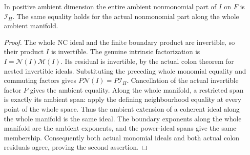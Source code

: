 \begin{theorem}
\label{hir:general-nc-actual-joint-residual}
\leanok
In positive ambient dimension the entire ambient nonmonomial part of
$I$ on $F$ is $\mathcal I_H$. The same equality holds for the actual
nonmonomial part along the whole ambient manifold.
\end{theorem}
\begin{proof}
The whole NC ideal and the finite boundary product are invertible, so
their product $I$ is invertible. The genuine intrinsic factorization is
$I=\mathcal N(I)\mathcal M(I)$. Its residual is invertible, by the actual
colon theorem for nested invertible ideals. Substituting the preceding
whole monomial equality and commuting factors gives
$P\mathcal N(I)=P\mathcal I_H$. Cancellation of the actual invertible
factor $P$ gives the ambient equality. Along the whole manifold, a
restricted span is exactly its ambient span: apply the defining
neighbourhood equality at every point of the whole space. Thus the
ambient extension of a coherent ideal along the whole manifold is the
same ideal. The boundary exponents along the whole manifold are the
ambient exponents, and the power-ideal spans give the same membership.
Consequently both actual monomial ideals and both actual colon
residuals agree, proving the second assertion.
\end{proof}

